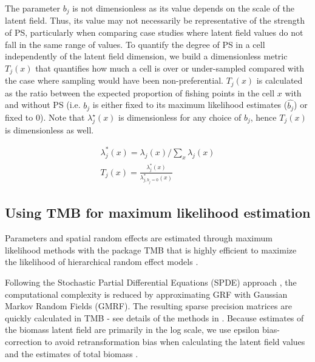 The parameter \(b_j\) is not dimensionless as its value depends on the scale of the latent field. Thus, its value may not necessarily be representative of the strength of PS, particularly when comparing case studies where latent field values do not fall in the same range of values. To quantify the degree of PS in a cell independently of the latent field dimension, we build a dimensionless metric \(T_j(x)\) that quantifies how much a cell is over or under-sampled compared with the case where sampling would have been non-preferential. \(T_j (x)\) is calculated as the ratio between the expected proportion of fishing points in the cell \(x\) with and without  PS (i.e. \(b_j\) is either fixed to its maximum likelihood estimates (\(\hat{b_j}\)) or fixed to 0). Note that \(\lambda_{j}^\star (x)\) is dimensionless for any choice of \(b_j\), hence \(T_j(x)\) is dimensionless as well.

\begin{equation*}
\begin{gathered}
\lambda_{j}^{*}(x)=\lambda_{j}(x) / \sum_{x} \lambda_{j}(x) \\
T_{j}(x)=\frac{\lambda_{j}^{*}(x)}{\lambda_{j, b_{j}=0}^{*}(x)}
\end{gathered}
\end{equation*}

\clearpage

\subsection{Using TMB for maximum likelihood estimation}\label{appendix:TMB}

Parameters and spatial random effects are estimated through maximum likelihood methods with the package TMB that is highly efficient to maximize the likelihood of hierarchical random effect models \parencite{kristensen-tmb-2016}.

Following the Stochastic Partial Differential Equations (SPDE) approach \parencite{lindgren-explicit-2011}, the computational complexity is reduced by approximating GRF with Gaussian Markov Random Fields (GMRF). The resulting sparse precision matrices are quickly calculated in TMB - see details of the methods in  \textcite{kristensen-tmb-2016}. Because estimates of the biomass latent field are primarily in the log scale, we use epsilon bias-correction to avoid retransformation bias when calculating the latent field values and the estimates of total biomass \parencite{thorson-implementing-2016}.

